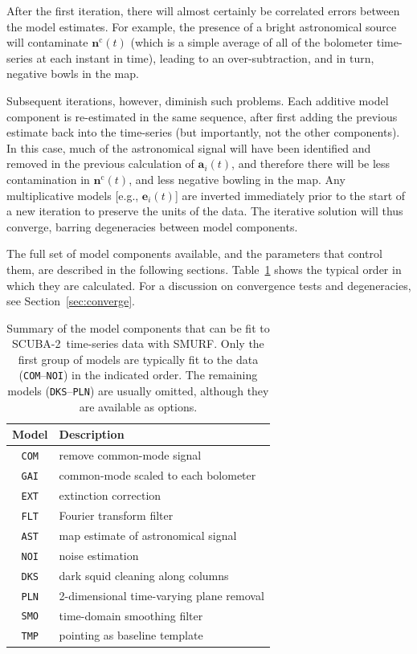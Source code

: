 \documentclass[useAMS,usenatbib,nofootinbib]{mn2e}
\newcommand{\scuba}{SCUBA-2}
\newcommand{\model}[1]{\texttt{#1}}
\begin{document}
After the first iteration, there will almost certainly be correlated
errors between the model estimates. For example, the presence of a
bright astronomical source will contaminate $\mathbf{n}^\mathrm{c}(t)$
(which is a simple average of all of the bolometer time-series at each
instant in time), leading to an over-subtraction, and in turn,
negative bowls in the map.

Subsequent iterations, however, diminish such problems. Each additive
model component is re-estimated in the same sequence, after first
adding the previous estimate back into the time-series (but
importantly, not the other components). In this case, much of the
astronomical signal will have been identified and removed in the
previous calculation of $\mathbf{a}_i(t)$, and therefore there will be
less contamination in $\mathbf{n}^\mathrm{c}(t)$, and less negative
bowling in the map. Any multiplicative models [e.g.,
$\mathbf{e}_i(t)$] are inverted immediately prior to the start of a
new iteration to preserve the units of the data. The iterative
solution will thus converge, barring degeneracies between model
components.

The full set of model components available, and the parameters that
control them, are described in the following
sections. Table~\ref{tab:components} shows the typical order in which
they are calculated. For a discussion on convergence tests and
degeneracies, see Section~\ref{sec:converge}.

\begin{table}
  \caption{Summary of the model components that can be fit to \scuba\
    time-series data with SMURF. Only the first group of models are
    typically fit to the data (\model{COM}--\model{NOI}) in the
    indicated order. The remaining models (\model{DKS}--\model{PLN})
    are usually omitted, although they are available as options.}
  \vspace{0.2cm}
  \centering
  \begin{tabular}{c|l}
    \hline
    Model & Description \\
    \hline
    \model{COM} & remove common-mode signal \\
    \model{GAI} & common-mode scaled to each bolometer \\
    \model{EXT} & extinction correction \\
    \model{FLT} & Fourier transform filter \\
    \model{AST} & map estimate of astronomical signal \\
    \model{NOI} & noise estimation \\
    \hline
    \model{DKS} & dark squid cleaning along columns \\
    \model{PLN} & 2-dimensional time-varying plane removal \\
    \model{SMO} & time-domain smoothing filter \\
    \model{TMP} & pointing as baseline template \\
    \hline
    \end{tabular}
  \label{tab:components}
\end{table}
\end{document}
